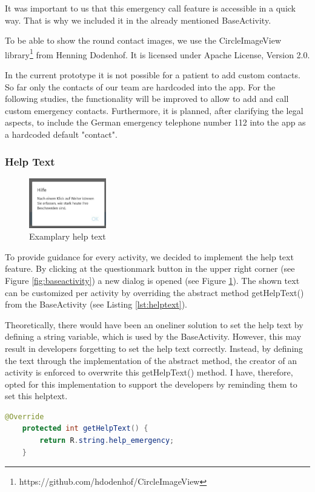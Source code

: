 It was important to us that this emergency call feature is accessible in a quick way. That is why we included it in the already mentioned BaseActivity.

To be able to show the round contact images, we use the CircleImageView library\footnote{https://github.com/hdodenhof/CircleImageView} from Henning Dodenhof. It is licensed under Apache License, Version 2.0.

In the current prototype it is not possible for a patient to add custom contacts. So far only the contacts of our team are hardcoded into the app. For the following studies, the functionality will be improved to allow to add and call custom emergency contacts. Furthermore, it is planned, after clarifying the legal aspects, to include the German emergency telephone number 112 into the app as a hardcoded default "contact".

\subsubsection{Help Text}
\begin{figure}
\vspace{-30pt}
  \begin{center}
    \includegraphics[width=0.30\textwidth]{figures/KlausHelpText.jpg}
  \end{center}
  \caption{Examplary help text}
  \label{fig:helptext}
  \vspace{-10pt}
\end{figure}
To provide guidance for every activity, we decided to implement the help text feature. By clicking at the questionmark button in the upper right corner (see Figure \ref{fig:baseactivity}) a new dialog is opened (see Figure \ref{fig:helptext}). The shown text can be customized per activity by overriding the abstract method getHelpText() from the BaseActivity (see Listing \ref{lst:helptext}).
 
Theoretically, there would have been an oneliner solution to set the help text by defining a string variable, which is used by the BaseActivity. However, this may result in developers forgetting to set the help text correctly. Instead, by defining the text through the implementation of the abstract method, the creator of an activity is enforced to overwrite this getHelpText() method. I have, therefore, opted for this implementation to support the developers by reminding them to set this helptext.
\begin{lstlisting}[language=Java, label={lst:helptext}, caption={Implementation of the getHelpText method in the emergency activity},captionpos=b]
    @Override
    protected int getHelpText() {
        return R.string.help_emergency;
    }
\end{lstlisting}

